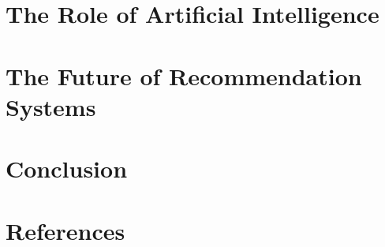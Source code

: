 \documentclass[12pt,a4paper]{article}
\begin{document}
\section{The Role of Artificial Intelligence}

\section{The Future of Recommendation Systems}

\section{Conclusion}

\newpage
\section{References}



\end{document}
